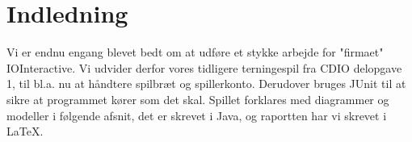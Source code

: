 \section{Indledning}
Vi er endnu engang blevet bedt om at udføre et stykke arbejde for "firmaet" IOInteractive. Vi udvider derfor vores tidligere terningespil fra CDIO delopgave 1, til bl.a. nu at håndtere spilbræt og spillerkonto. Derudover bruges JUnit til at sikre at programmet kører som det skal. Spillet forklares med diagrammer og modeller i følgende afsnit, det er skrevet i Java, og raportten har vi skrevet i LaTeX.
